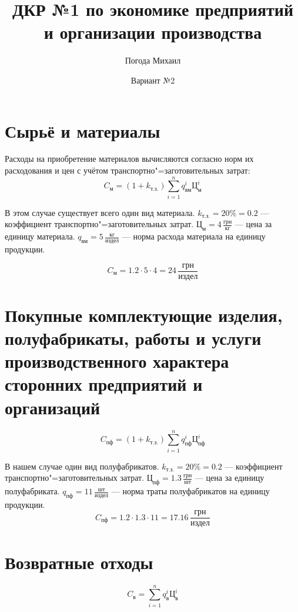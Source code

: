 \documentclass[a4paper,10pt,notitlepage,pdftex,headsepline]{scrartcl}
\author{Погода Михаил}
\title{ДКР №1 по экономике предприятий и организации производства}
\date{Вариант №2}
\begin{document}
  \maketitle

\section{Сырьё и материалы}
  Расходы на приобретение материалов вычисляются согласно норм их
  расходования и цен с учётом транспортно"=заготовительных затрат:
  \begin{equation}
    C_\text{м} = \left(1 + k_\text{т.з.}\right) \sum_{i = 1}^n q_\text{вм}^i
    \text{Ц}_\text{м}^i
    \label{eq:1}
  \end{equation}

  В этом случае существует всего один вид материала.
  $k_\text{т.з.} = 20\% = 0.2$ --- коэффициент транспортно"=заготовительных
  затрат.
  $\text{Ц}_\text{м} = 4\,\frac{\text{грн}}{\text{кг}}$ --- цена за единицу
  материала.
  $q_\text{вм} = 5\,\frac{\text{кг}}{\text{издел}}$ --- норма расхода материала
  на единицу продукции.

  \begin{equation}
    C_\text{м} = 1.2 \cdot 5 \cdot 4 = 24\,\frac{\text{грн}}{\text{издел}}
    \label{eq:r1}
  \end{equation}
\section{Покупные комплектующие изделия, полуфабрикаты, работы и услуги
производственного характера сторонних предприятий и организаций}
  \begin{equation}
    C_\text{пф} = \left( 1 + k_\text{т.з.}\right)\sum_{i = 1}^n q_\text{пф}^i
    \text{Ц}_\text{пф}^i
    \label{eq:2}
  \end{equation}

  В нашем случае один вид полуфабрикатов.
  $k_\text{т.з.} = 20\% = 0.2$ --- коэффициент транспортно"=заготовительных
  затрат.
  $\text{Ц}_\text{пф} = 1.3\,\frac{\text{грн}}{\text{шт}}$ --- цена за единицу
  полуфабриката.
  $q_\text{пф} = 11\,\frac{\text{шт}}{\text{издел}}$ --- норма траты
  полуфабрикатов на единицу продукции.
  \begin{equation}
    C_\text{пф} = 1.2 \cdot 1.3 \cdot 11 =
    17.16\,\frac{\text{грн}}{\text{издел}}
    \label{eq:r2}
  \end{equation}
\section{Возвратные отходы}
  \begin{equation}
    C_\text{в} = \sum_{i = 1}^n q_\text{в}^i \text{Ц}_\text{в}^i
    \label{eq:3}
  \end{equation}
\end{document}
